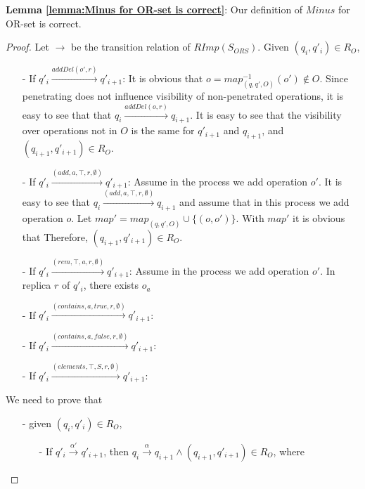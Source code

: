 {\noindent \bf Lemma \ref{lemma:Minus for OR-set is correct}}: Our definition of $Minus$ for OR-set is correct.

\begin {proof}

Let $\rightarrow$ be the transition relation of $RImp(S_{\textit{ORS}})$. Given $(q_i,q'_i) \in R_{O}$,

\begin{itemize}
\setlength{\itemsep}{0.5pt}
\item[-] If $q'_i {\xrightarrow{addDel(o',r)}} q'_{i+1}$: It is obvious that $o = map_{(q,q',O)}^{-1}(o') \notin O$. Since penetrating does not influence visibility of non-penetrated operations, it is easy to see that that $q_i {\xrightarrow{addDel(o,r)}} q_{i+1}$. It is easy to see that the visibility over operations not in $O$ is the same for $q'_{i+1}$ and $q_{i+1}$, and $(q_{i+1},q'_{i+1}) \in R_{O}$.

\item[-] If $q'_i {\xrightarrow{(add,a,\top,r,\emptyset)}} q'_{i+1}$: Assume in the process we add operation $o'$. It is easy to see that $q_i {\xrightarrow{(add,a,\top,r,\emptyset)}} q_{i+1}$ and assume that in this process we add operation $o$. Let $map' = map_{(q,q',O)} \cup \{ (o,o') \}$. With $map'$ it is obvious that Therefore, $(q_{i+1},q'_{i+1}) \in R_{O}$.

\item[-] If $q'_i {\xrightarrow{(rem,\top,a,r,\emptyset)}} q'_{i+1}$: Assume in the process we add operation $o'$. In replica $r$ of $q'_i$, there exists $o_a$

\item[-] If $q'_i {\xrightarrow{(contains,a,\textit{true},r,\emptyset)}} q'_{i+1}$: 

\item[-] If $q'_i {\xrightarrow{(contains,a,\textit{false},r,\emptyset)}} q'_{i+1}$: 

\item[-] If $q'_i {\xrightarrow{(elements,\top,S,r,\emptyset)}} q'_{i+1}$: 
\end{itemize}



We need to prove that

\begin{itemize}
\setlength{\itemsep}{0.5pt}
\item[-] given $(q_i,q'_i) \in R_{O}$,
    \begin{itemize}
    \setlength{\itemsep}{0.5pt}
    \item[-] If $q'_i {\xrightarrow{\alpha'}} q'_{i+1}$, then $q_i {\xrightarrow{\alpha}} q_{i+1} \wedge (q_{i+1},q'_{i+1}) \in R_{O}$, where


\end{itemize}
\end{itemize}
\end{proof}
